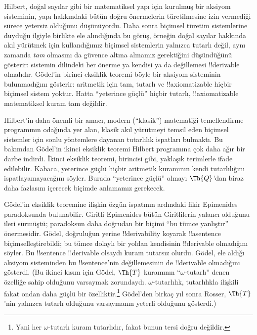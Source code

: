



Hilbert, doğal sayılar gibi bir matematiksel yapı için kurulmuş bir aksiyom
sisteminin, yapı hakkındaki bütün doğru önermelerin türetilmesine izin
vermediği sürece yetersiz olduğunu düşünüyordu. Daha sonra biçimsel türetim
sistemlerine duyduğu ilgiyle birlikte ele alındığında bu görüş, örneğin doğal
sayılar hakkında akıl yürütmek için kullandığımız biçimsel sistemlerin yalnızca
tutarlı değil, aynı zamanda \emph{tam} olmasını da güvence altına almamız
gerektiğini düşündüğünü gösterir: sistemin dilindeki her önerme ya kendisi ya
da değillemesi !!{derivable} olmalıdır. G\"odel'in birinci eksiklik teoremi
böyle bir aksiyom sisteminin bulunmadığını gösterir: aritmetik için tam,
tutarlı ve !!{axiomatizable} hiçbir biçimsel sistem yoktur. Hatta ``yeterince
güçlü'' hiçbir tutarlı, !!{axiomatizable} matematiksel kuram tam değildir.

Hilbert'in daha önemli bir amacı, modern (``klasik'') matematiği temellendirme
programının odağında yer alan, klasik akıl yürütmeyi temsil eden biçimsel
sistemler için sonlu yöntemlere dayanan tutarlılık ispatları bulmaktı. Bu
bakımdan G\"odel'in ikinci eksiklik teoremi Hilbert programına çok daha ağır
bir darbe indirdi. İkinci eksiklik teoremi, birincisi gibi, yaklaşık terimlerle
ifade edilebilir. Kabaca, yeterince güçlü hiçbir aritmetik kuramının kendi
tutarlılığını ispatlayamayacağını söyler. Burada ``yeterince güçlü'' olmayı
$\Th{Q}$'dan biraz daha fazlasını içerecek biçimde anlamamız gerekecek.

G\"odel'in eksiklik teoremine ilişkin özgün ispatının ardındaki fikir
Epimenides paradoksunda bulunabilir. Giritli Epimenides bütün Giritlilerin
yalancı olduğunu ileri sürmüştü; paradoksun daha doğrudan bir biçimi ``bu
tümce yanlıştır'' önermesidir. G\"odel, doğruluğun yerine !!{derivability}
koyarak !!a{sentence} biçimselleştirebildi; bu tümce dolaylı bir yoldan
kendisinin !!{derivable} olmadığını söyler. Bu !!{sentence} !!{derivable} olsaydı
kuram tutarsız olurdu. G\"odel, ele aldığı aksiyom sisteminden bu
!!{sentence}'nin değillemesinin de !!{derivable} olmadığını gösterdi. (Bu
ikinci kısım için G\"odel, $\Th{T}$ kuramının ``$\omega$-tutarlı'' denen
özelliğe sahip olduğunu varsaymak zorundaydı. $\omega$-tutarlılık,
tutarlılıkla ilişkili fakat ondan daha güçlü bir özelliktir.\footnote{Yani her
$\omega$-tutarlı kuram tutarlıdır, fakat bunun tersi doğru değildir.}
G\"odel'den birkaç yıl sonra Rosser, $\Th{T}$'nin yalnızca tutarlı olduğunu
varsaymanın yeterli olduğunu gösterdi.)

